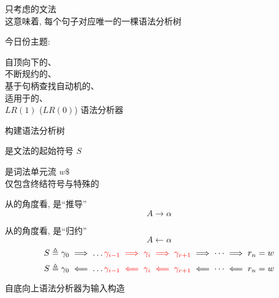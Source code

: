 
\begin{frame}{}
  \begin{center}
    只考虑的文法 \\[4pt]
    这意味着, 每个句子对应唯一的一棵语法分析树


    今日份主题: 
  \end{center}
\end{frame}

\begin{frame}{}
  \begin{center}
    自顶向下的、\\[15pt]
    不断规约的、\\[15pt]
    基于句柄查找自动机的、\\[15pt]
    适用于的、\\[15pt]
    $LR(1)$ ($LR(0)$) 语法分析器
  \end{center}
\end{frame}

\begin{frame}{}
  \begin{center}
    {\large {}构建语法分析树}

    \vspace{0.60cm}
    是文法的起始符号 $S$

    \vspace{1.00cm}

    \vspace{1.00cm}
    是词法单元流 $w\$$ \\[8pt]
    仅包含终结符号与特殊的
  \end{center}
\end{frame}

\begin{frame}{}
  \begin{center}

    \vspace{0.60cm}
    从的角度看, 是``推导''
    \[
      A \to \alpha
    \]

    从的角度看, 是``归约''
    \[
      A \gets \alpha
    \]
    \[
      S \triangleq \gamma_{0} \implies \dots
        \textcolor{red}{\gamma_{i-1} \implies \gamma_{i} \implies \gamma_{r+1}}
        \implies \dots \implies r_{n} = w
    \]
    \[
      S \triangleq \gamma_{0} \impliedby \dots
        \textcolor{red}{\gamma_{i-1} \impliedby \gamma_{i} \impliedby \gamma_{r+1}}
        \impliedby \dots \impliedby r_{n} = w
    \]

    \vspace{0.50cm}
    自底向上语法分析器为输入构造
  \end{center}
\end{frame}

